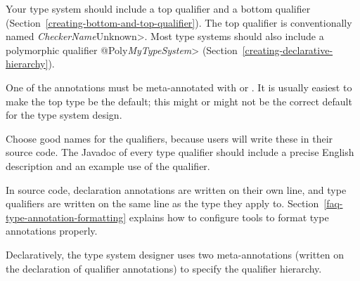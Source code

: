 
Your type system should include a top qualifier and a bottom qualifier
(Section~\ref{creating-bottom-and-top-qualifier}).
The top qualifier is conventionally named \<\emph{CheckerName}Unknown>.
Most type systems should also include a
polymorphic qualifier \<@Poly\emph{MyTypeSystem}>
(Section~\ref{creating-declarative-hierarchy}).

One of the annotations must be meta-annotated with
 or
.
It is usually easiest to make the top type be the default; this might or might
not be the correct default for the type system design.

Choose good names for the qualifiers, because users will write these in
their source code.
The Javadoc of every type qualifier should include a precise English
description and an example use of the qualifier.

In source code, declaration annotations are written on their own line, and
type qualifiers are written on the same line as the type they apply to.
Section~\ref{faq-type-annotation-formatting} explains how to configure
tools to format type annotations properly.



Declaratively, the type system designer uses two meta-annotations (written
on the declaration of qualifier annotations) to specify the qualifier
hierarchy.

